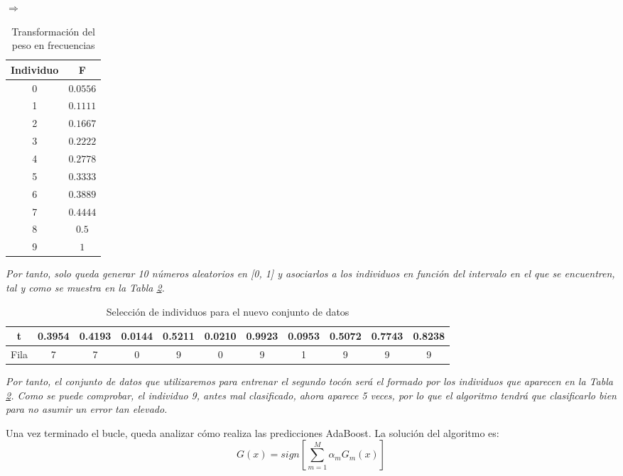 \documentclass[12pt,twoside]{article}
\begin{document}
\begin{table}[H]
\centering
$\Rightarrow$
\begin{tabular}{|c|c|}
\hline
Individuo & F \\ \hline
0 & $0.0556$ \\ \hline
1 & $0.1111$ \\ \hline
2 & $0.1667$ \\ \hline
3 & $0.2222$ \\ \hline
4 & $0.2778$ \\ \hline
5 & $0.3333$ \\ \hline
6 & $0.3889$ \\ \hline
7 & $0.4444$ \\ \hline
8 & $0.5$ \\ \hline
9 & $1$ \\ \hline
\end{tabular}
\caption{Transformación del peso en frecuencias}
\label{tab:AdaB_pesos_ex}
\end{table}

\textit{Por tanto, solo queda generar 10 números aleatorios en [0, 1] y asociarlos a los individuos en función del intervalo en el que se encuentren, tal y como se muestra en la Tabla \ref{tab:AdaB_selec}.}
\begin{table}[H]
\centering
\begin{tabular}{|c|c|c|c|c|c|c|c|c|c|c|}
\hline
t & 0.3954 & 0.4193 & 0.0144 & 0.5211 & 0.0210 & 0.9923 & 0.0953 & 0.5072 & 0.7743 & 0.8238 \\ \hline
Fila & 7 & 7 & 0 & 9 & 0 & 9 & 1 & 9 & 9 & 9 \\ \hline
\end{tabular}
\caption{Selección de individuos para el nuevo conjunto de datos}
\label{tab:AdaB_selec}
\end{table}

\textit{Por tanto, el conjunto de datos que utilizaremos para entrenar el segundo tocón será el formado por los individuos que aparecen en la Tabla \ref{tab:AdaB_selec}. Como se puede comprobar, el individuo 9, antes mal clasificado, ahora aparece 5 veces, por lo que el algoritmo tendrá que clasificarlo bien para no asumir un error tan elevado.}

\bigskip \bigskip


Una vez terminado el bucle, queda analizar cómo realiza las predicciones AdaBoost. La solución del algoritmo es:
\begin{equation*}
G(x) = sign \left[ \sum_{m=1}^M \alpha_m G_m(x) \right]
\end{equation*}
\end{document}
